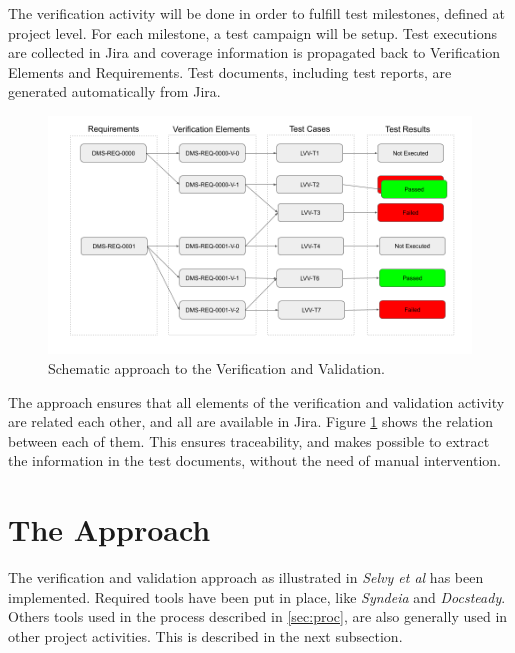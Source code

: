 The verification activity will be done in order to fulfill test milestones, defined at project level.
For each milestone, a test campaign will be setup. 
Test executions are collected in Jira and coverage information is propagated back to Verification Elements and Requirements.
Test documents, including test reports, are generated automatically from Jira.

\begin{figure}
\begin{center}
\includegraphics[width=\textwidth]{imgs/VandVSchema.png}
 \caption{Schematic approach to the Verification and Validation.}
 \label{fig:vandvschema}
\end{center}
\end{figure}

The approach ensures that all elements of the verification and validation activity are related each other, and all are available in Jira.
Figure \ref{fig:vandvschema} shows the relation between each of them.
This ensures traceability, and makes possible to extract the information in the test documents, without the need of manual intervention.


\section{The Approach}

The verification and validation approach as illustrated in  \textit{Selvy et al}\cite{10.1117/12.2310125}  has been implemented.
Required tools have been put in place, like \textit{Syndeia} and \textit{Docsteady}.
Others tools used in the process described in \ref{sec:proc}, are also generally used in other project activities. 
This is described in the next subsection.

